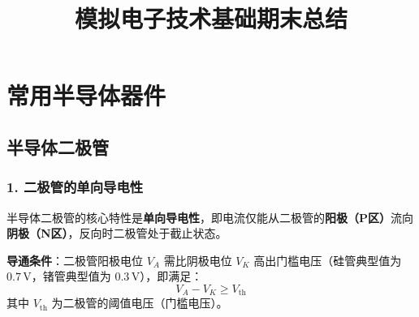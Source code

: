 \documentclass[12pt]{article}
\title{模拟电子技术基础期末总结}
\author{}
\date{}
\newcommand{\Vth}{V_{\text{th}}}
\begin{document}
\maketitle
\thispagestyle{empty} %
\newpage

\tableofcontents
\thispagestyle{fancy}
\newpage

\section{常用半导体器件}
\subsection{半导体二极管}

\subsubsection{1. 二极管的单向导电性}
半导体二极管的核心特性是\textbf{单向导电性}，即电流仅能从二极管的\textbf{阳极（P区）}流向\textbf{阴极（N区）}，反向时二极管处于截止状态。

\textbf{导通条件}：二极管阳极电位 $V_A$ 需比阴极电位 $V_K$ 高出门槛电压（硅管典型值为 $0.7\,\text{V}$，锗管典型值为 $0.3\,\text{V}$），即满足：
\[
V_A - V_K \geq \Vth
\]
其中 $\Vth$ 为二极管的阈值电压（门槛电压）。



\end{document}
